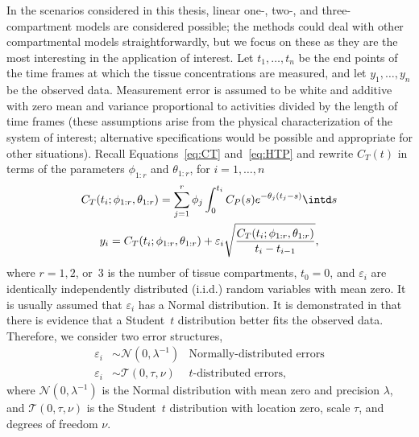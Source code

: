 In the scenarios considered in this thesis, linear one-, two-, and
three-compartment models are considered possible; the methods could deal with
other compartmental models straightforwardly, but we focus on these as they
are the most interesting in the application of interest. Let $t_1, \dots,
t_n$ be the end points of the time frames at which the tissue concentrations
are measured, and let $y_1,\dots,y_n$ be the observed data. Measurement error
is assumed to be white and additive with zero mean and variance proportional
to activities divided by the length of time frames (these assumptions arise
from the physical characterization of the \pet system of interest;
alternative specifications would be possible and appropriate for other
situations). Recall Equations~\eqref{eq:CT} and~\eqref{eq:HTP} and rewrite
$C_T(t)$ in terms of the parameters $\phi_{1:r}$ and $\theta_{1:r}$, for $i =
1,\dots,n$
\begin{gather*}
  C_T(t_i;\phi_{1:r},\theta_{1:r}) =
  \sum_{j=1}^r \phi_j\int_0^{t_i}C_P(s)e^{-\theta_j(t_j-s)} \intd s \\
  y_i = C_T(t_i;\phi_{1:r},\theta_{1:r}) +
  \varepsilon_i\sqrt{\frac{C_T(t_i;\phi_{1:r},\theta_{1:r})} {t_i - t_{i-1}}},
\end{gather*}
where $r = 1, 2$, or~$3$ is the number of tissue compartments, $t_0 = 0$, and
$\varepsilon_i$ are identically independently distributed (i.i.d.) random
variables with mean zero. It is usually assumed that $\varepsilon_i$ has a
Normal distribution. It is demonstrated in \cite{Zhou2013} that there is
evidence that a Student~$t$ distribution better fits the observed data.
Therefore, we consider two error structures,
\begin{align*}
  \varepsilon_i &\sim \mathcal{N}(0,\lambda^{-1})
  &\text{Normally-distributed errors} \\
  \varepsilon_i &\sim \mathcal{T}(0,\tau,\nu)
  &\text{$t$-distributed errors},
\end{align*}
where $\mathcal{N}(0,\lambda^{-1})$ is the Normal distribution with mean zero
and precision $\lambda$, and $\mathcal{T}(0,\tau,\nu)$ is the Student~$t$
distribution with location zero, scale $\tau$, and degrees of freedom $\nu$.
